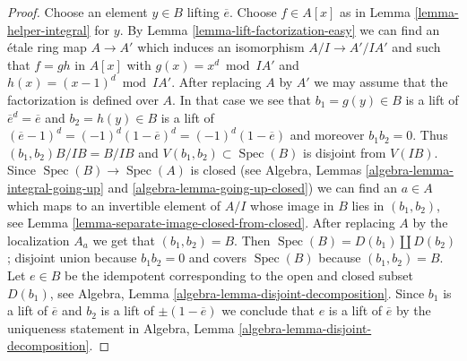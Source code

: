\documentclass[10pt,a4paper]{amsart}
\theoremstyle{plain}
\theoremstyle{definition}
\theoremstyle{remark}
\numberwithin{equation}{subsection}
\def\Spec{\mathop{\mathrm{Spec}}}
\begin{document}
\begin{proof}
Choose an element $y \in B$ lifting $\overline{e}$.
Choose $f \in A[x]$ as in Lemma \ref{lemma-helper-integral} for $y$.
By Lemma \ref{lemma-lift-factorization-easy}
we can find an \'etale ring map $A \to A'$ which induces
an isomorphism $A/I \to A'/IA'$ and such that $f = gh$
in $A[x]$ with $g(x) = x^d \bmod IA'$ and $h(x) = (x - 1)^d \bmod IA'$.
After replacing $A$ by $A'$ we may assume that the factorization
is defined over $A$. In that case we see that
$b_1 = g(y) \in B$ is a lift of $\overline{e}^d = \overline{e}$ and
$b_2 = h(y) \in B$ is a lift of
$(\overline{e} - 1)^d = (-1)^d (1 - \overline{e})^d = (-1)^d(1 - \overline{e})$
and moreover $b_1b_2 = 0$. Thus $(b_1, b_2)B/IB = B/IB$ and
$V(b_1, b_2) \subset \Spec(B)$ is disjoint from $V(IB)$. Since
$\Spec(B) \to \Spec(A)$ is closed (see
Algebra, Lemmas \ref{algebra-lemma-integral-going-up} and
\ref{algebra-lemma-going-up-closed})
we can find an $a \in A$ which maps to an invertible element
of $A/I$ whose image in $B$ lies in $(b_1, b_2)$, see
Lemma \ref{lemma-separate-image-closed-from-closed}.
After replacing $A$ by the localization $A_a$ we get that
$(b_1, b_2) = B$. Then $\Spec(B) = D(b_1) \amalg D(b_2)$;
disjoint union because $b_1b_2 = 0$ and covers
$\Spec(B)$ because $(b_1, b_2) = B$. Let $e \in B$ be the idempotent
corresponding to the open and closed subset $D(b_1)$, see
Algebra, Lemma \ref{algebra-lemma-disjoint-decomposition}.
Since $b_1$ is a lift of $\overline{e}$ and $b_2$ is a
lift of $\pm (1 - \overline{e})$ we conclude that $e$ is
a lift of $\overline{e}$ by the uniqueness statement in
Algebra, Lemma \ref{algebra-lemma-disjoint-decomposition}.
\end{proof}
\end{document}
